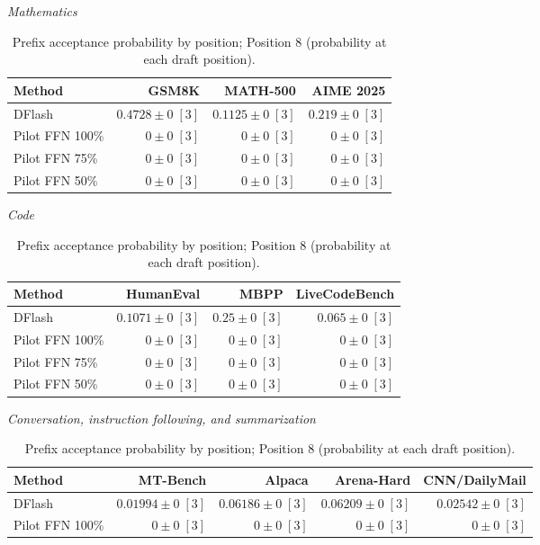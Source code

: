 \begin{table}[!htp]
\centering\small
\setlength{\tabcolsep}{3pt}
\caption{Prefix acceptance probability by position; Position 8 (probability at each draft position).}
\label{tab:appendix-metric-prefix-survival-8}
\textit{Mathematics}\par\smallskip
\begin{tabular}{@{}>{\raggedright\arraybackslash}p{3.7cm}rrr@{}}
\toprule
Method & GSM8K & MATH-500 & AIME 2025 \\
\midrule
DFlash & \(\mathbf{0.4728} \pm 0\;[3]\) & \(\mathbf{0.1125} \pm 0\;[3]\) & \(\mathbf{0.219} \pm 0\;[3]\) \\
Pilot FFN 100\% & \(0 \pm 0\;[3]\) & \(0 \pm 0\;[3]\) & \(0 \pm 0\;[3]\) \\
Pilot FFN 75\% & \(0 \pm 0\;[3]\) & \(0 \pm 0\;[3]\) & \(0 \pm 0\;[3]\) \\
Pilot FFN 50\% & \(0 \pm 0\;[3]\) & \(0 \pm 0\;[3]\) & \(0 \pm 0\;[3]\) \\
\bottomrule
\end{tabular}\par\medskip
\textit{Code}\par\smallskip
\begin{tabular}{@{}>{\raggedright\arraybackslash}p{3.7cm}rrr@{}}
\toprule
Method & HumanEval & MBPP & LiveCodeBench \\
\midrule
DFlash & \(\mathbf{0.1071} \pm 0\;[3]\) & \(\mathbf{0.25} \pm 0\;[3]\) & \(\mathbf{0.065} \pm 0\;[3]\) \\
Pilot FFN 100\% & \(0 \pm 0\;[3]\) & \(0 \pm 0\;[3]\) & \(0 \pm 0\;[3]\) \\
Pilot FFN 75\% & \(0 \pm 0\;[3]\) & \(0 \pm 0\;[3]\) & \(0 \pm 0\;[3]\) \\
Pilot FFN 50\% & \(0 \pm 0\;[3]\) & \(0 \pm 0\;[3]\) & \(0 \pm 0\;[3]\) \\
\bottomrule
\end{tabular}\par\medskip
\textit{Conversation, instruction following, and summarization}\par\smallskip
\begin{tabular}{@{}>{\raggedright\arraybackslash}p{3.7cm}rrrr@{}}
\toprule
Method & MT-Bench & Alpaca & Arena-Hard & CNN/DailyMail \\
\midrule
DFlash & \(\mathbf{0.01994} \pm 0\;[3]\) & \(\mathbf{0.06186} \pm 0\;[3]\) & \(\mathbf{0.06209} \pm 0\;[3]\) & \(\mathbf{0.02542} \pm 0\;[3]\) \\
Pilot FFN 100\% & \(0 \pm 0\;[3]\) & \(0 \pm 0\;[3]\) & \(0 \pm 0\;[3]\) & \(0 \pm 0\;[3]\) \\

\end{tabular}
\end{table}
